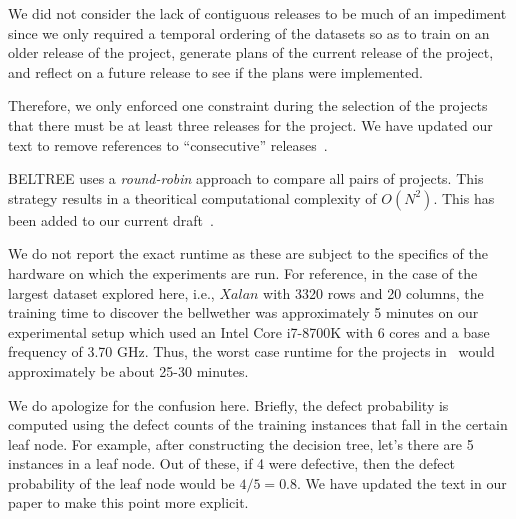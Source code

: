 We did not consider the lack of contiguous releases to be much of an impediment since we only required a temporal ordering of the datasets so as to train on an older release of the project, generate plans of the current release of the project, and reflect on a future release to see if the plans were implemented. 

Therefore, we only enforced one constraint during the selection of the projects that there must be at least three releases for the project. We have updated our text to remove references to \enquote{consecutive} releases~.


BELTREE uses a \textit{round-robin} approach to compare all pairs of projects. This strategy results in a theoritical computational complexity of $O(N^2)$. This has been added to our current draft~. 

We do not report the exact runtime as these are subject to the specifics of the hardware on which the experiments are run. For reference, in the case of the largest dataset explored here, i.e., $\mathit{Xalan}$ with 3320 rows and 20 columns, the training time to discover the bellwether was approximately 5 minutes on our experimental setup which used an Intel Core i7-8700K with 6 cores and a base frequency of 3.70 GHz. Thus, the worst case runtime for the projects in~ would approximately be about 25-30 minutes.


We do apologize for the confusion here. Briefly, the defect probability is computed using the defect counts of the training instances that fall in the certain leaf node. For example, after constructing the decision tree, let's there are 5 instances in a leaf node. Out of these, if 4 were defective, then the defect probability of the leaf node would be $4/5 = 0.8$.  We have updated the text in our paper to make this point more explicit.


